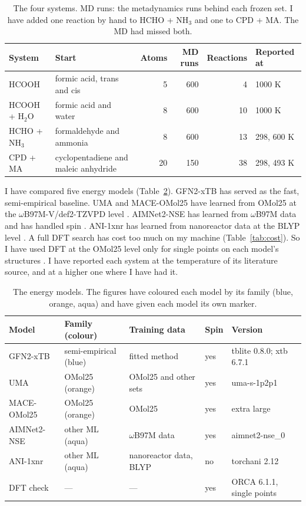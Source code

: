 \documentclass[11pt]{article}
\begin{document}
\begin{table}[htbp]
\centering
\caption{The four systems. MD runs: the metadynamics runs behind each
frozen set. I have added one reaction by hand to HCHO + NH$_3$ and one to
CPD + MA. The MD had missed both.}
\label{tab:systems}
\small
\begin{tabular}{@{}llrrrl@{}}
\toprule
System & Start & Atoms & MD runs & Reactions & Reported at \\
\midrule
HCOOH & formic acid, trans and cis & 5 & 600 & 4 & 1000 K \\
HCOOH + H$_2$O & formic acid and water & 8 & 600 & 10 & 1000 K \\
HCHO + NH$_3$ & formaldehyde and ammonia & 8 & 600 & 13 & 298, 600 K \\
CPD + MA & cyclopentadiene and maleic anhydride & 20 & 150 & 38 &
298, 493 K \\
\bottomrule
\end{tabular}
\end{table}

I have compared five energy models (Table~\ref{tab:engines}). GFN2-xTB has
served as the fast, semi-empirical baseline. UMA and MACE-OMol25 have
learned from OMol25 at the $\omega$B97M-V/def2-TZVPD level
\cite{omol25,uma,mace}. AIMNet2-NSE has learned from $\omega$B97M data
and has handled spin \cite{aimnet2}. ANI-1xnr has learned from nanoreactor
data at the BLYP level \cite{ani1xnr,torchani}. A full DFT search has
cost too much on my machine (Table~\ref{tab:cost}). So I have used DFT at
the OMol25 level only for single points on each model's structures
\cite{wb97mv,orca}. I have reported each system at
the temperature of its literature source, and at a higher one where I have
had it.

\begin{table}[htbp]
\centering
\caption{The energy models. The figures have coloured each model by its
family (blue, orange, aqua) and have given each model its own marker.}
\label{tab:engines}
\small
\begin{tabular}{@{}lllll@{}}
\toprule
Model & Family (colour) & Training data & Spin & Version \\
\midrule
GFN2-xTB & semi-empirical (blue) & fitted method & yes &
tblite 0.8.0; xtb 6.7.1 \\
UMA & OMol25 (orange) & OMol25 and other sets & yes & uma-s-1p2p1 \\
MACE-OMol25 & OMol25 (orange) & OMol25 & yes & extra large \\
AIMNet2-NSE & other ML (aqua) & $\omega$B97M data & yes &
aimnet2-nse\_0 \\
ANI-1xnr & other ML (aqua) & nanoreactor data, BLYP & no &
torchani 2.12 \\
DFT check & --- & --- & yes & ORCA 6.1.1, single points \\
\bottomrule
\end{tabular}
\end{table}
\end{document}
